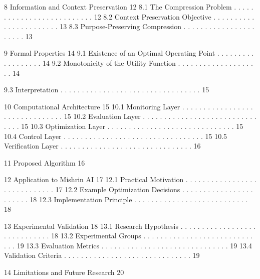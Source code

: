 \documentclass[10pt,a4paper]{article}
\begin{document}
\begin{ManuscriptText}
8 Information and Context Preservation                                                  12
  8.1 The Compression Problem . . . . . . . . . . . . . . . . . . . . . . . . . .       12
  8.2 Context Preservation Objective . . . . . . . . . . . . . . . . . . . . . . .      13
  8.3 Purpose-Preserving Compression . . . . . . . . . . . . . . . . . . . . . .        13

9 Formal Properties                                                                     14
  9.1 Existence of an Optimal Operating Point . . . . . . . . . . . . . . . . . .       14
  9.2 Monotonicity of the Utility Function . . . . . . . . . . . . . . . . . . . .      14


   9.3   Interpretation . . . . . . . . . . . . . . . . . . . . . . . . . . . . . . . . .   15

10 Computational Architecture                                                               15
   10.1 Monitoring Layer . . . . . . . . . . . . . . . . . . . . . . . . . . . . . . .      15
   10.2 Evaluation Layer . . . . . . . . . . . . . . . . . . . . . . . . . . . . . . .      15
   10.3 Optimization Layer . . . . . . . . . . . . . . . . . . . . . . . . . . . . . .      15
   10.4 Control Layer . . . . . . . . . . . . . . . . . . . . . . . . . . . . . . . . .     15
   10.5 Verification Layer . . . . . . . . . . . . . . . . . . . . . . . . . . . . . . .    16

11 Proposed Algorithm                                                                       16

12 Application to Mishrin AI                                                                17
   12.1 Practical Motivation . . . . . . . . . . . . . . . . . . . . . . . . . . . . .      17
   12.2 Example Optimization Decisions . . . . . . . . . . . . . . . . . . . . . . .        18
   12.3 Implementation Principle . . . . . . . . . . . . . . . . . . . . . . . . . . .      18

13 Experimental Validation                                                                  18
   13.1 Research Hypothesis . . . . . . . . . . . . . . . . . . . . . . . . . . . . .       18
   13.2 Experimental Groups . . . . . . . . . . . . . . . . . . . . . . . . . . . . .       19
   13.3 Evaluation Metrics . . . . . . . . . . . . . . . . . . . . . . . . . . . . . .      19
   13.4 Validation Criteria . . . . . . . . . . . . . . . . . . . . . . . . . . . . . .     19

14 Limitations and Future Research                                                          20


\end{ManuscriptText}
\end{document}
